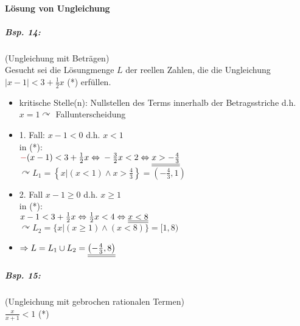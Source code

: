 \paragraph{Lösung von Ungleichung}
\subparagraph{Bsp. 14:} (Ungleichung mit Beträgen)\\
Gesucht sei die Lösungmenge $L$ der reellen Zahlen, die die Ungleichung $|x-1|<3+\frac{1}{2}x$ (*) erfüllen.
\begin{itemize}
\item kritische Stelle(n): Nullstellen des Terms innerhalb der Betragsstriche d.h. $x=1 \curvearrowright$ Fallunterscheidung\\
\item 1. Fall: $x-1<0$ d.h. $x<1$\\
in (*): \\
$\tred{-}(x-1)<3+\frac{1}{2}x \Leftrightarrow \\
-\frac{3}{2}x<2 \Leftrightarrow \\
\resultul{x>-\frac{4}{3}}$\\
$\curvearrowright L_1=\left\lbrace x|(x<1) \wedge x>\frac{4}{3}\right\rbrace = \left(-\frac{4}{3},1\right)$
\item 2. Fall $x-1 \geq 0$ d.h. $x\geq 1$\\
in (*):\\
$x-1< 3+ \frac{1}{2}x \Leftrightarrow\\
\frac{1}{2}x<4 \Leftrightarrow\\
\underline{\underline{x<8}}$\\
$\curvearrowright L_2 = \{ x| (x\geq 1) \wedge (x <8)\}=[1,8)$
\item $\Rightarrow L = L_1 \cup L_2 = \underline{\underline{\left(-\frac{4}{3},8\right)}}$
\end{itemize}
\subparagraph{Bsp. 15:} (Ungleichung mit gebrochen rationalen Termen)\\
$\frac{x}{x+1}<1$ (*)
